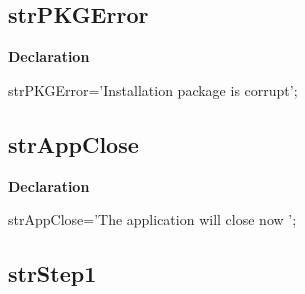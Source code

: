 \documentclass{report}
\newif\ifpdf
\begin{document}
\subsection*{strPKGError}
\fi
\label{trstrings-strPKGError}
\begin{list}{}{
\setlength{\itemindent}{0cm}
\setlength{\listparindent}{0cm}
\setlength{\leftmargin}{\evensidemargin}
\addtolength{\leftmargin}{\tmplength}
\settowidth{\labelsep}{X}
\addtolength{\leftmargin}{\labelsep}
\setlength{\labelwidth}{\tmplength}
}
\item[\textbf{Declaration}\hfill]
\ifpdf
\begin{flushleft}
\fi
\begin{ttfamily}
strPKGError='Installation package is corrupt';\end{ttfamily}

\ifpdf
\end{flushleft}
\fi

\end{list}
\ifpdf
\subsection*{\large{\textbf{strAppClose}}\normalsize\hspace{1ex}\hrulefill}
\else
\subsection*{strAppClose}
\fi
\label{trstrings-strAppClose}
\begin{list}{}{
\setlength{\itemindent}{0cm}
\setlength{\listparindent}{0cm}
\setlength{\leftmargin}{\evensidemargin}
\addtolength{\leftmargin}{\tmplength}
\settowidth{\labelsep}{X}
\addtolength{\leftmargin}{\labelsep}
\setlength{\labelwidth}{\tmplength}
}
\item[\textbf{Declaration}\hfill]
\ifpdf
\begin{flushleft}
\fi
\begin{ttfamily}
strAppClose='The application will close now ';\end{ttfamily}

\ifpdf
\end{flushleft}
\fi

\end{list}
\ifpdf
\subsection*{\large{\textbf{strStep1}}\normalsize\hspace{1ex}\hrulefill}
\else
\end{document}
